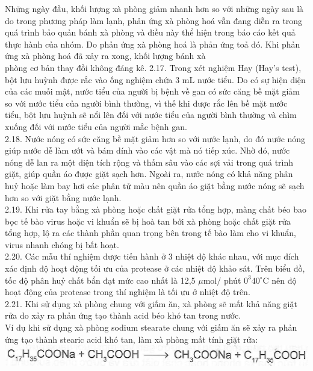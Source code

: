 \documentclass[10pt]{article}
\begin{document}
Những ngày đầu, khối lượng xà phòng giảm nhanh hơn so với những ngày sau là do trong phương pháp làm lạnh, phản ứng xà phòng hoá vẫn đang diễn ra trong quá trình bảo quản bánh xà phòng và điều này thể hiện trong báo cáo kết quả thực hành của nhóm. Do phản ứng xà phòng hoá là phản ứng toả đó. Khi phản ứng xà phòng hoá đã xảy ra xong, khối lượng bánh xà\\
phòng cơ bản thay đồi không đáng kê. 2.17. Trong xét nghiệm Hay (Hay's test), bột lưu huỳnh được rắc vào ống nghiệm chứa 3 mL nước tiểu. Do có sự hiện diện của các muối mật, nước tiểu của người bị bệnh về gan có sức căng bề mặt giảm so với nước tiểu của người bình thường, vì thế khi được rắc lên bề mặt nước\\
tiểu, bột lưu huỳnh sẽ nổi lên đối với nước tiểu của người bình thường và chìm xuống đối với nước tiểu của người mắc bệnh gan.\\
2.18. Nước nóng có sức căng bề mặt giảm hơn so với nước lạnh, do đó nước nóng giúp nước dễ làm ướt và bám dính vào các vật mà nó tiếp xúc. Nhờ đó, nước nóng dễ lan ra một diện tích rộng và thấm sâu vào các sợi vải trong quá trình giặt, giúp quần áo được giặt sạch hơn. Ngoài ra, nước nóng có khả năng phân huỷ hoặc làm bay hơi các phân tử màu nên quần áo giặt bằng nước nóng sẽ sạch hơn so với giặt bằng nước lạnh.\\
2.19. Khi rửa tay bằng xà phòng hoặc chất giặt rửa tổng hợp, màng chất béo bao bọc tế bào virus hoặc vi khuẩn sẽ bị hoà tan bởi xà phòng hoặc chất giặt rửa tổng hợp, lộ ra các thành phần quan trọng bên trong tế bào làm cho vi khuẩn, virus nhanh chóng bị bất hoạt.\\
2.20. Các mẫu thí nghiệm được tiến hành ở 3 nhiệt độ khác nhau, với mục đích xác định độ hoạt động tối ưu của protease ở các nhiệt độ khảo sát. Trên biểu đồ, tốc độ phân huỷ chất bẩn đạt mức cao nhất là 12,5 $\mu \mathrm{mol} /$ phút $0^{3} 40^{\circ} \mathrm{C}$ nên độ hoạt động của protease trong thí nghiệm là tối ưu ở nhiệt độ trên.\\
2.21. Khi sử dụng xà phòng chung với giấm ăn, xà phòng sẽ mất khả năng giặt rửa do xảy ra phản ứng tạo thành acid béo khó tan trong nước.\\
Ví dụ khi sử dụng xà phòng sodium stearate chung với giấm ăn sẽ xảy ra phản ứng tạo thành stearic acid khó tan, làm xà phòng mất tính giặt rửa:\\
\includegraphics[max width=\textwidth, center]{2025_10_23_b4e16b74380d0f7e7700g-012}\\
\end{document}
